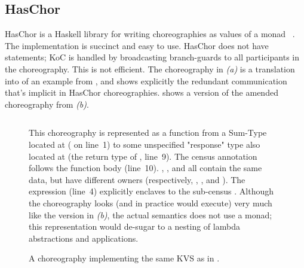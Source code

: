 \subsection{HasChor}\label{sec:haschor}
HasChor is a Haskell library for writing choreographies as values
of a monad ~\cite{shen-haschor}.
The implementation is succinct and easy to use.
HasChor does not have  statements;
KoC is handled by broadcasting branch-guards to all participants in the choreography.
This is not efficient.
The choreography in \emph{(a)}
is a translation into \MultiChor of an example from \cite{shen-haschor},
and shows explicitly the redundant communication that's implicit in HasChor choreographies.
 shows a \HLSCentral version of the amended choreography from \emph{(b)}.

\begin{figure}[tbhp]
    \begin{mdframed}
    \inputminted[xleftmargin=10pt,linenos,fontsize=\scriptsize]{bash}{figures/kvs_hls.txt}
  \begin{minipage}{0.95\linewidth}
    This choreography is represented as a function from a Sum-Type located at 
    ( on line~1)
    to some unspecified "response" type also located at 
    (the return type of , line~9).
    The census annotation follows the function body (line~10).
    , , and  all contain the same data,
    but have different owners (respectively, \inlinecode{[client]}, \inlinecode{[primary]}, and ).
    The  expression (line~4) explicitly enclaves to the sub-census .
    Although the choreography looks (and in practice would execute) very much like the \MultiChor version in \emph{(b)},
    the actual semantics does not use a monad;
    this representation would de-sugar to a nesting of lambda abstractions and applications.
  \end{minipage}
    \caption{A \HLSCentral choreography implementing the same KVS as in .}
    \label{fig:our-kvs}
    \end{mdframed}
\end{figure}


